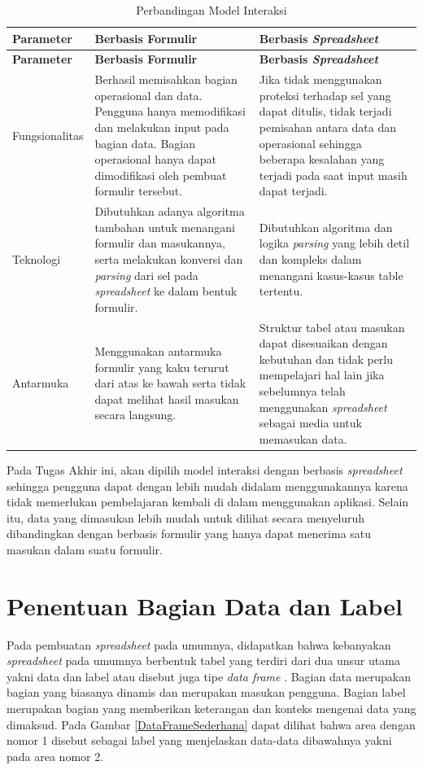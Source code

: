 	\begin{longtable}{ | p{3cm} | p{4cm} | p{4cm} | }
	    \caption{Perbandingan Model Interaksi}
	    \label{ModelInteraksi}\\ \hline
	    \centering\bfseries{Parameter} & \centering\bfseries{Berbasis Formulir} & \centering\bfseries{Berbasis \textit{Spreadsheet}} \tabularnewline \hline
	    \endfirsthead
	    \hline
	    \centering\bfseries{Parameter} & \centering\bfseries{Berbasis Formulir} & \centering\bfseries{Berbasis \textit{Spreadsheet}} \tabularnewline \hline
	    \endhead
	    Fungsionalitas & Berhasil memisahkan bagian operasional dan data. Pengguna hanya memodifikasi dan melakukan input pada bagian data. Bagian operasional hanya dapat dimodifikasi oleh pembuat formulir tersebut. & Jika tidak menggunakan proteksi terhadap sel yang dapat ditulis, tidak terjadi pemisahan antara data dan operasional sehingga beberapa kesalahan yang terjadi pada saat input masih dapat terjadi. \\ \hline
	    Teknologi & Dibutuhkan adanya algoritma tambahan untuk menangani formulir dan masukannya, serta melakukan konversi dan \textit{parsing} dari sel pada \textit{spreadsheet} ke dalam bentuk formulir. & Dibutuhkan algoritma dan logika \textit{parsing} yang lebih detil dan kompleks dalam menangani kasus-kasus table tertentu. \\ \hline
	    Antarmuka & Menggunakan antarmuka formulir yang kaku terurut dari atas ke bawah serta tidak dapat melihat hasil masukan secara langsung. & Struktur tabel atau masukan dapat disesuaikan dengan kebutuhan dan tidak perlu mempelajari hal lain jika sebelumnya telah menggunakan \textit{spreadsheet} sebagai media untuk memasukan data. \\ \hline
  	\end{longtable}

  	Pada Tugas Akhir ini, akan dipilih model interaksi dengan berbasis \textit{spreadsheet} sehingga pengguna dapat dengan lebih mudah didalam menggunakannya karena tidak memerlukan pembelajaran kembali di dalam menggunakan aplikasi. Selain itu, data yang dimasukan lebih mudah untuk dilihat secara menyeluruh dibandingkan dengan berbasis formulir yang hanya dapat menerima satu masukan dalam suatu formulir.

\section{Penentuan Bagian Data dan Label}
Pada pembuatan \textit{spreadsheet} pada umumnya, didapatkan bahwa kebanyakan \textit{spreadsheet} pada umumnya berbentuk tabel yang terdiri dari dua unsur utama yakni data dan label atau disebut juga tipe \textit{data frame} \citep{Chen2013}. Bagian data merupakan bagian yang biasanya dinamis dan merupakan masukan pengguna. Bagian label merupakan bagian yang memberikan keterangan dan konteks mengenai data yang dimaksud. Pada Gambar \ref{DataFrameSederhana} dapat dilihat bahwa area dengan nomor 1 disebut sebagai label yang menjelaskan data-data dibawahnya yakni pada area nomor 2.

